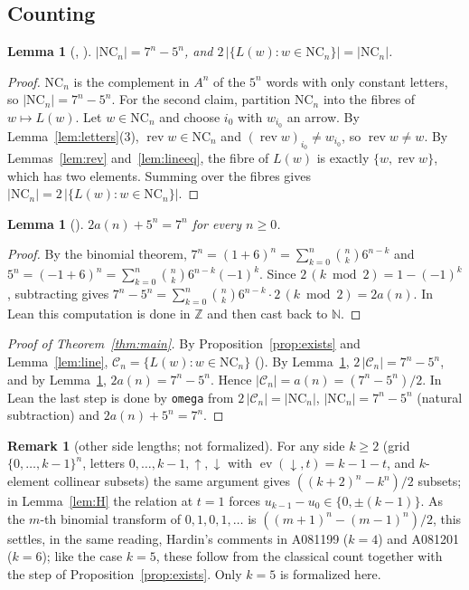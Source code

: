 \documentclass[11pt]{amsart}
\theoremstyle{plain}
\newtheorem{lemma}[theorem]{Lemma}
\theoremstyle{definition}
\newtheorem{remark}[theorem]{Remark}
\newcommand{\N}{\mathbb{N}}
\newcommand{\Z}{\mathbb{Z}}
\newcommand{\up}{{\uparrow}}
\newcommand{\dn}{{\downarrow}}
\newcommand{\ev}{\operatorname{ev}}
\newcommand{\rev}{\operatorname{rev}}
\newcommand{\NC}{\mathrm{NC}}
\begin{document}
\subsection{Counting}

\begin{lemma}[, ]\label{lem:count}
$|\NC_n|=7^n-5^n$, and $2\,\bigl|\{L(w): w\in\NC_n\}\bigr|=|\NC_n|$.
\end{lemma}

\begin{proof}
$\NC_n$ is the complement in $A^n$ of the $5^n$ words with only constant letters, so $|\NC_n|=7^n-5^n$.
For the second claim, partition $\NC_n$ into the fibres of $w\mapsto L(w)$. Let $w\in\NC_n$ and choose $i_0$ with $w_{i_0}$ an arrow. By Lemma~\ref{lem:letters}(3), $\rev w\in\NC_n$ and $(\rev w)_{i_0}\ne w_{i_0}$, so $\rev w\ne w$. By Lemmas~\ref{lem:rev} and~\ref{lem:lineeq}, the fibre of $L(w)$ is exactly $\{w,\rev w\}$, which has two elements. Summing over the fibres gives $|\NC_n|=2\,|\{L(w): w\in\NC_n\}|$.
\end{proof}

\begin{lemma}[]\label{lem:aeq}
$2a(n)+5^n=7^n$ for every $n\ge0$.
\end{lemma}

\begin{proof}
By the binomial theorem, $7^n=(1+6)^n=\sum_{k=0}^n\binom nk 6^{n-k}$ and $5^n=(-1+6)^n=\sum_{k=0}^n\binom nk 6^{n-k}(-1)^k$. Since $2\,(k\bmod 2)=1-(-1)^k$, subtracting gives $7^n-5^n=\sum_{k=0}^n\binom nk6^{n-k}\cdot2\,(k\bmod2)=2a(n)$. In Lean this computation is done in $\Z$ and then cast back to $\N$.
\end{proof}

\begin{proof}[Proof of Theorem~\ref{thm:main}]
By Proposition~\ref{prop:exists} and Lemma~\ref{lem:line}, $\mathcal C_n=\{L(w): w\in\NC_n\}$ (). By Lemma~\ref{lem:count}, $2\,|\mathcal C_n|=7^n-5^n$, and by Lemma~\ref{lem:aeq}, $2a(n)=7^n-5^n$. Hence $|\mathcal C_n|=a(n)=(7^n-5^n)/2$. In Lean the last step is done by \texttt{omega} from $2\,|\mathcal C_n|=|\NC_n|$, $|\NC_n|=7^n-5^n$ (natural subtraction) and $2a(n)+5^n=7^n$.
\end{proof}

\begin{remark}[other side lengths; not formalized]\label{rem:k}
For any side $k\ge2$ (grid $\{0,\dots,k-1\}^n$, letters $0,\dots,k-1,\up,\dn$ with $\ev(\dn,t)=k-1-t$, and $k$-element collinear subsets) the same argument gives $((k+2)^n-k^n)/2$ subsets; in Lemma~\ref{lem:H} the relation at $t=1$ forces $u_{k-1}-u_0\in\{0,\pm(k-1)\}$. As the $m$-th binomial transform of $0,1,0,1,\dots$ is $((m+1)^n-(m-1)^n)/2$, this settles, in the same reading, Hardin's comments in A081199 ($k=4$) and A081201 ($k=6$); like the case $k=5$, these follow from the classical count together with the step of Proposition~\ref{prop:exists}. Only $k=5$ is formalized here.
\end{remark}
\end{document}
